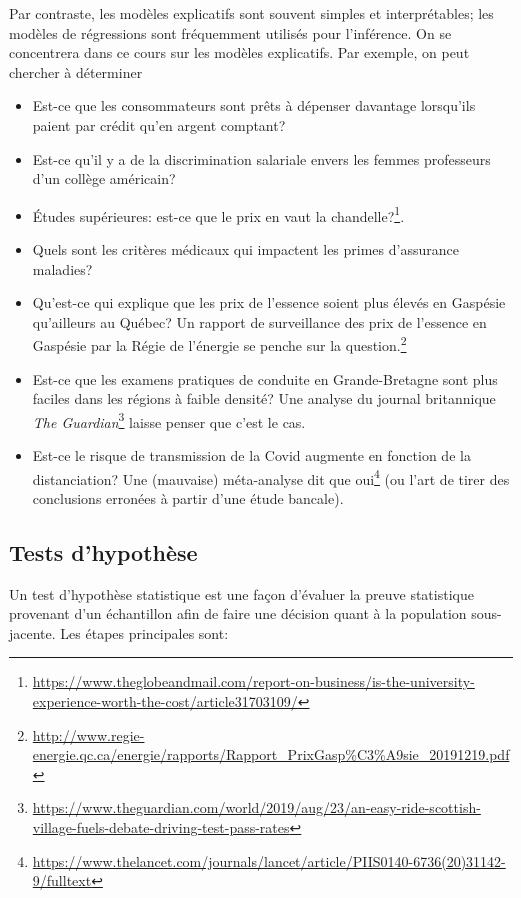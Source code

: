 \documentclass[
  11pt,
  letterpaper,
]{article}
\providecommand{\tightlist}{%
  \setlength{\itemsep}{0pt}\setlength{\parskip}{0pt}}
\renewcommand{\href}[2]{#2\footnote{\url{#1}}}
\theoremstyle{definition}
\theoremstyle{definition}
\theoremstyle{definition}
\theoremstyle{definition}
\theoremstyle{remark}
\begin{document}
Par contraste, les modèles explicatifs sont souvent simples et interprétables; les modèles de régressions sont fréquemment utilisés pour l'inférence. On se concentrera dans ce cours sur les modèles explicatifs. Par exemple, on peut chercher à déterminer

\begin{itemize}
\tightlist
\item
  Est-ce que les consommateurs sont prêts à dépenser davantage lorsqu'ils paient par crédit qu'en argent comptant?
\item
  Est-ce qu'il y a de la discrimination salariale envers les femmes professeurs d'un collège américain?
\item
  Études supérieures: \href{https://www.theglobeandmail.com/report-on-business/is-the-university-experience-worth-the-cost/article31703109/}{est-ce que le prix en vaut la chandelle?}.
\item
  Quels sont les critères médicaux qui impactent les primes d'assurance maladies?
\item
  Qu'est-ce qui explique que les prix de l'essence soient plus élevés en Gaspésie qu'ailleurs au Québec? \href{http://www.regie-energie.qc.ca/energie/rapports/Rapport_PrixGasp\%C3\%A9sie_20191219.pdf}{Un rapport de surveillance des prix de l'essence en Gaspésie par la Régie de l'énergie se penche sur la question.}
\item
  Est-ce que les examens pratiques de conduite en Grande-Bretagne sont plus faciles dans les régions à faible densité? \href{https://www.theguardian.com/world/2019/aug/23/an-easy-ride-scottish-village-fuels-debate-driving-test-pass-rates}{Une analyse du journal britannique \emph{The Guardian}} laisse penser que c'est le cas.
\item
  Est-ce le risque de transmission de la Covid augmente en fonction de la distanciation? \href{https://www.thelancet.com/journals/lancet/article/PIIS0140-6736(20)31142-9/fulltext}{Une (mauvaise) méta-analyse dit que oui} (ou l'art de tirer des conclusions erronées à partir d'une étude bancale).
\end{itemize}

\hypertarget{tests}{%
\subsection{Tests d'hypothèse}\label{tests}}

Un test d'hypothèse statistique est une façon d'évaluer la preuve statistique provenant d'un échantillon afin de faire une décision quant à la population sous-jacente. Les étapes principales sont:
\end{document}
